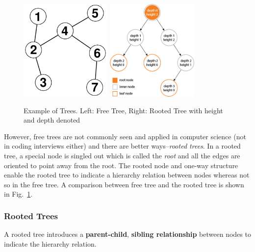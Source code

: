 \documentclass[../main.tex]{subfiles}
\begin{document}
\begin{figure}[!ht]
    \centering
    \includegraphics[width=0.4\columnwidth, height=5cm]{fig/542px-Graph_theory_tree.png}
    \includegraphics[width=0.55\columnwidth, height=5cm]{fig/tree_property.png}
    \caption{Example of Trees. Left: Free Tree, Right: Rooted Tree with height and depth denoted}
    \label{fig:tree_property}
\end{figure}
However, free trees are not commonly seen and applied in computer science (not in coding interviews either) and there are better ways--\textit{rooted trees}. In a  {rooted tree}, a special node is singled out which is called the \textit{root} and all the edges are oriented to point away from the root. The rooted node and one-way structure enable the rooted tree to indicate a hierarchy relation between nodes whereas not so in the free tree. A comparison between free tree and the rooted tree is shown  in Fig.~\ref{fig:tree_property}.



\subsubsection{Rooted Trees}  A rooted tree introduces a \textbf{parent-child}, \textbf{sibling relationship} between nodes to indicate the hierarchy relation.  
\end{document}
